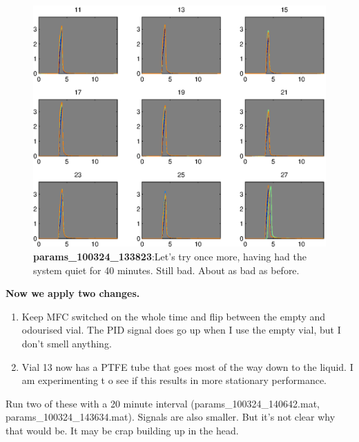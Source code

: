 \documentclass[a4paper]{report}
\begin{document}
\begin{figure}
\centering
\includegraphics[width=5in]{params_100324_133823.eps}
\caption{\textbf{params\_100324\_133823}:Let's try once more, having
  had the system quiet for 40 minutes.  Still bad. About as bad as
  before.}
\end{figure}

\clearpage
\textbf{Now we apply two changes. }
\begin{enumerate}
\item Keep MFC switched on the whole time and flip between the empty and
odourised vial. The PID signal does go up when I use the empty vial,
but I don't smell anything. 

\item Vial 13 now has a PTFE tube that goes most of the way down to the
liquid. I am experimenting t   o see if this results in more stationary
performance. 
\end{enumerate}
Run two of these with a 20 minute interval (params\_100324\_140642.mat,
params\_100324\_143634.mat). Signals are also smaller. But it's not
clear why that would be. It may be crap building up in the head. 
\end{document}
